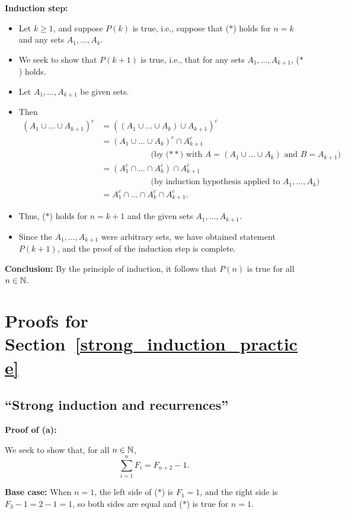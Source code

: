 \textbf{Induction step:} 
\begin{itemize}
\item Let $k\ge 1$, and suppose $P(k)$ is true, i.e.,
suppose that ($*$) holds for $n=k$ and any sets $A_1,\dots,A_k$.
\item
We seek to show that $P(k+1)$ is true, i.e., that for
any sets $A_1,\dots,A_{k+1}$, ($*$) holds. 
\item
Let $A_1,\dots,A_{k+1}$  be given sets.
\item
Then
\begin{align*}
\left(A_1\cup \dots \cup A_{k+1}\right)^c
&=\left(\left(A_1\cup \dots \cup A_{k}\right)\cup A_{k+1}\right)^c
\\
&=\left(A_1\cup \dots \cup A_{k}\right)^c\cap A_{k+1}^c
\quad\\
& \qquad \qquad\qquad \text{(by ($**$) with $A=(A_1\cup \dots \cup A_k)$ and 
$B=A_{k+1}$)}
\\
&=\left(A_1^c\cap\dots \cap A_k^c\right)\cap A_{k+1}^c\\
& \qquad \qquad\qquad \text{(by induction hypothesis applied to $A_1,\dots, A_k$)}
\\
&=A_1^c\cap\dots \cap A_k^c\cap A_{k+1}^c.
\end{align*}
\item
Thus, ($*$) holds for $n=k+1$
and the given sets $A_1,\dots,A_{k+1}$.
\item 
Since the $A_1,\dots,A_{k+1}$ were
arbitrary sets, we have obtained statement $P(k+1)$, and the 
proof of the induction step is complete.
\end{itemize}

\textbf{Conclusion:} By the principle of induction, 
it follows that $P(n)$ is true for all $n\in\mathbb{N}$.  
 

\section{Proofs for Section~\ref{strong_induction_practice}}
\subsection{``Strong induction and recurrences''}

\noindent
\textbf{Proof of (a):}

We seek to show that, for all $n\in\mathbb{N}$, 
\[
\tag{$*$}
\sum_{i=1}^n F_i=F_{n+2}-1.
\]

\textbf{Base case:} When $n=1$, the left side of ($*$) is $F_1 =1$,
and the
right side is $F_3-1=2-1=1$, so both sides are equal and ($*$) is
true for $n=1$.

